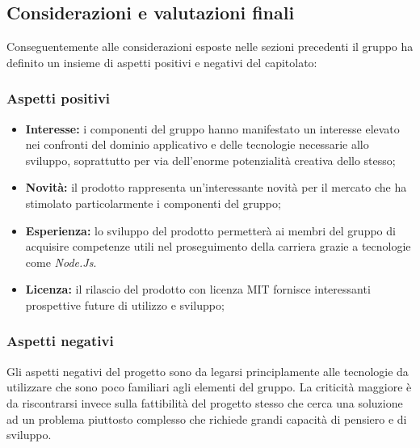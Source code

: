   \subsection{Considerazioni e valutazioni finali}
    Conseguentemente alle considerazioni esposte nelle sezioni precedenti il gruppo ha definito un
    insieme di aspetti positivi e negativi del capitolato:
    \subsubsection{Aspetti positivi}
      \begin{itemize}
        \item \textbf{Interesse:} i componenti del gruppo hanno manifestato un interesse elevato nei confronti del dominio applicativo e delle tecnologie necessarie
        allo sviluppo, soprattutto per via dell'enorme potenzialità creativa dello stesso;
        \item \textbf{Novità:} il prodotto rappresenta un'interessante novità per il mercato che ha stimolato particolarmente i componenti del gruppo;
        \item \textbf{Esperienza:} lo sviluppo del prodotto permetterà ai membri del gruppo di acquisire competenze utili nel proseguimento della carriera
        grazie a tecnologie come \emph{Node.Js}.
        \item \textbf{Licenza:} il rilascio del prodotto con licenza MIT fornisce interessanti
         prospettive future di utilizzo e sviluppo;
     \end{itemize}
   \subsubsection{Aspetti negativi}
    Gli aspetti negativi del progetto sono da legarsi principlamente alle tecnologie da utilizzare che sono poco familiari agli elementi del gruppo.
    La criticità maggiore è da riscontrarsi invece sulla fattibilità del progetto stesso che cerca una soluzione ad un problema piuttosto complesso che richiede grandi
    capacità di pensiero e di sviluppo.
